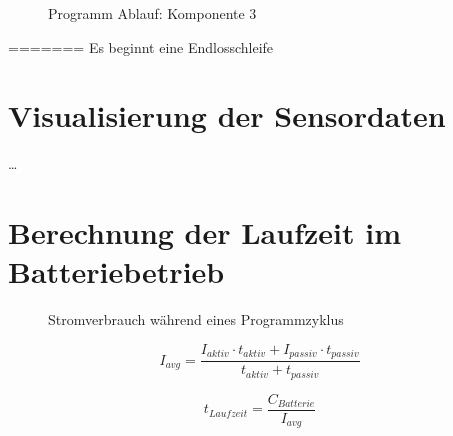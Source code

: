 \begin{center}
	\begin{figure}[h]
	 
	 \noindent{}
	 \caption[PAP komponente 3]{Programm Ablauf: Komponente 3}
	 \label{fig:MQTTpubsub}
	\end{figure}
\end{center}
=======
Es beginnt eine Endlosschleife

\newpage



\section{Visualisierung der Sensordaten} \label{Dashboard und Visualisierung}

\ldots


\section{Berechnung der Laufzeit im Batteriebetrieb} \label{Simulation}

\begin{center}
	\begin{figure}[h]
	 
	 \noindent{}
	 \caption[Stromverbrauch während eines Programmzyklus]{Stromverbrauch während eines Programmzyklus}
	 \label{fig:stromzyklus}
	\end{figure}
\end{center}

\[I_{avg} = \frac{I_{aktiv}\cdot t_{aktiv} + I_{passiv} \cdot t_{passiv}}{t_{aktiv} + t_{passiv}}\]

\[t_{Laufzeit} = \frac{C_{Batterie}}{I_{avg}}\]

\newpage


